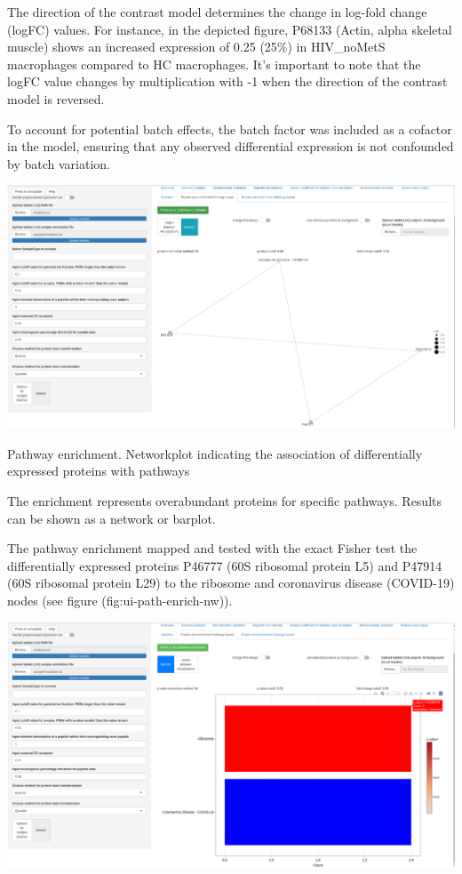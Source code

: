 \documentclass[
  11pt,
]{article}
\let\origfigure\figure
\begin{document}
The direction of the contrast model determines the change in log-fold change (logFC) values. For instance, in the depicted figure, P68133 (Actin, alpha skeletal muscle) shows an increased expression of 0.25 (25\%) in HIV\_noMetS macrophages compared to HC macrophages. It's important to note that the logFC value changes by multiplication with -1 when the direction of the contrast model is reversed.

To account for potential batch effects, the batch factor was included as a cofactor in the model, ensuring that any observed differential expression is not confounded by batch variation.

\newpage
\bgroup  \origfigure[H] 

{\centering \includegraphics[width=0.9\linewidth]{screenshots/path_enrich_nw} 

}

\caption{Pathway enrichment. Networkplot indicating the association of differentially expressed proteins with pathways}\label{fig:ui-path-enrich-nw}
 \endfigure\egroup

The enrichment represents overabundant proteins for specific pathways. Results can be shown as a network or barplot.

The pathway enrichment mapped and tested with the exact Fisher test \citep{Sprent2011} the differentially expressed proteins P46777 (60S ribosomal protein L5) and P47914 (60S ribosomal protein L29) to the ribosome and coronavirus disease (COVID-19) nodes (see figure (fig:ui-path-enrich-nw)).

\newpage
\bgroup  \origfigure[H] 

{\centering \includegraphics[width=0.9\linewidth]{screenshots/path_enrich_bar} 

}
\end{document}
